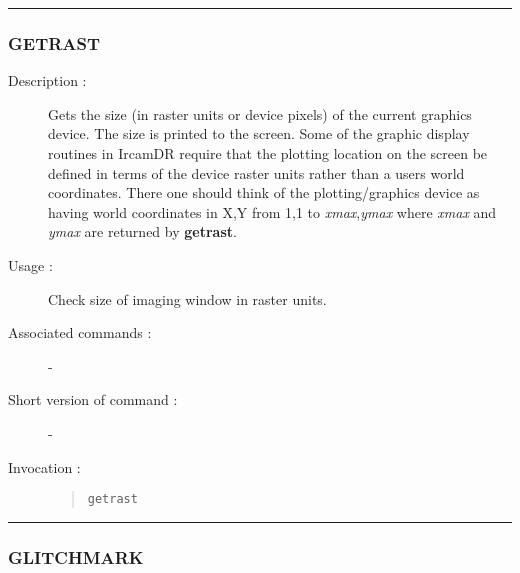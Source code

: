 \hrule
\subsubsection*{\label{GETRAST}GETRAST}

\begin{description}

\item[Description :] Gets the size (in raster units or device pixels)
of the current graphics device. The size is printed to the screen.
Some of the graphic display routines in {\sc IrcamDR} require that the
plotting location on the screen be defined in terms of the device
raster units rather than a users world coordinates.  There one should
think of the plotting/graphics device as having world coordinates in
X,Y from 1,1 to {\it xmax},{\it ymax} where {\it xmax} and {\it ymax}
are returned by {\bf getrast}.

\item[Usage :] Check size of imaging window in raster units.
\item[Associated commands :] -
\item[Short version of command :] -
\item[Invocation :]

\begin{quote}{\tt  getrast }\end{quote}

\end{description}

\hrule
\subsubsection*{\label{GLITCHMARK}GLITCHMARK}

